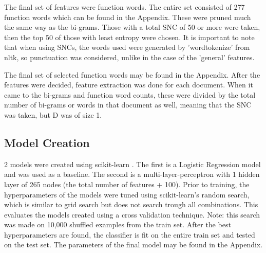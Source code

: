 The final set of features were function words. The entire set consisted of 277 function words which can be found in the Appendix. These were pruned much the same way as the bi-grams. Those with a total SNC of 50 or more were taken, then the top 50 of those with least entropy were chosen. It is important to note that when using SNCs, the words used were generated by 'word\textunderscore tokenize' from nltk, so punctuation was considered, unlike in the case of the 'general' features.

The final set of selected function words may be found in the Appendix. After the features were decided, feature extraction was done for each document. When it came to the bi-grams and function word counts, these were divided by the total number of bi-grams or words in that document as well, meaning that the SNC was taken, but D was of size 1.

\subsection{Model Creation}
2 models were created using scikit-learn \cite{scikit-learn}. The first is a Logistic Regression model and was used as a baseline. The second is a multi-layer-perceptron with 1 hidden layer of 265 nodes (the total number of features + 100). Prior to training, the hyperparameters of the models were tuned using scikit-learn's random search, which is similar to grid search but does not search trough all combinations. This evaluates the models created using a cross validation technique. Note: this search was made on 10,000 shuffled examples from the train set. After the best hyperparameters are found, the classifier is fit on the entire train set and tested on the test set. The parameters of the final model may be found in the Appendix.